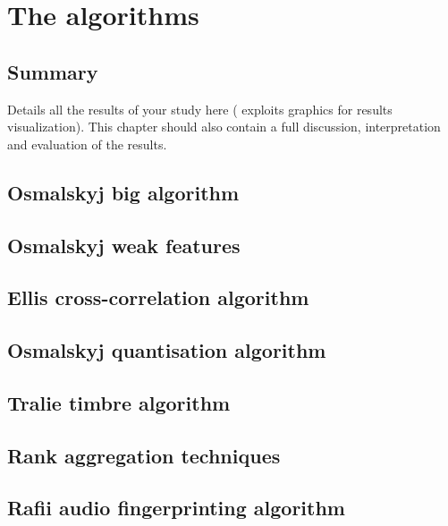 
\chapter{The algorithms}
\label{chap:algorithms}
\ifpdf
    \graphicspath{{Algorithms/Figures/PNG/}{EvaluationTask/Figures/PDF/}{Algorithms/Figures/}}
\else
    \graphicspath{{Algorithms/Figures/EPS/}{EvaluationTask/Figures/}}
\fi


\section*{Summary}
Details all the results of your study here ( exploits graphics for results visualization). 
This chapter should also contain a full discussion, interpretation and evaluation of the results. 



\section{Osmalskyj big algorithm} 
\label{sec:osmalskyj}
\section{Osmalskyj weak features} 
\label{sec:weakfeatures}
\section{Ellis cross-correlation algorithm} 
\label{sec:ccs}
\section{Osmalskyj quantisation algorithm} 
\label{sec:quantisation}
\section{Tralie timbre algorithm} 
\label{sec:timbre}
\section{Rank aggregation techniques} 
\label{sec:rankaggregation}
\section{Rafii audio fingerprinting algorithm} 
\label{sec:rafii}


